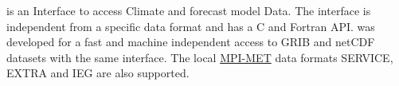 {\CDI} is an Interface to access Climate and forecast model Data.
The interface is independent from a specific data format and has a C and Fortran API.
{\CDI} was developed for a fast and machine independent access to GRIB
and netCDF datasets with the same interface.
The local \href{http://www.mpimet.mpg.de/}{MPI-MET} data formats SERVICE, EXTRA and 
IEG are also supported.



